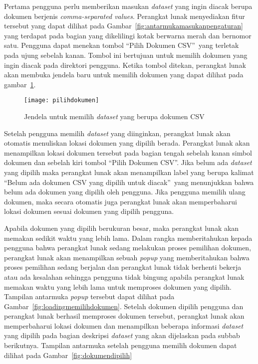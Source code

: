 Pertama pengguna perlu memberikan masukan \textit{dataset} yang ingin diacak berupa dokumen berjenis \textit{comma-separated values}. Perangkat lunak menyediakan fitur tersebut yang dapat dilihat pada Gambar~\ref{fig:antarmukamasukanpengaturan} yang terdapat pada bagian yang dikelilingi kotak berwarna merah dan bernomor satu. Pengguna dapat menekan tombol \textquotedblleft Pilih Dokumen CSV\textquotedblright~yang terletak pada ujung sebelah kanan. Tombol ini bertujuan untuk memilih dokumen yang ingin diacak pada direktori pengguna. Ketika tombol ditekan, perangkat lunak akan membuka jendela baru untuk memilih dokumen yang dapat dilihat pada gambar~\ref{fig:pilihdokumen}.

\begin{figure}
	\centering
	\texttt{[image: pilihdokumen]}
	\caption{Jendela untuk memilih \textit{dataset} yang berupa dokumen CSV}
	\label{fig:pilihdokumen}
\end{figure}

Setelah pengguna memilih \textit{dataset} yang diinginkan, perangkat lunak akan otomatis menuliskan lokasi dokumen yang dipilih berada. Perangkat lunak akan menampilkan lokasi dokumen tersebut pada bagian tengah sebelah kanan simbol dokumen dan sebelah kiri tombol \textquotedblleft Pilih Dokumen CSV\textquotedblright. Jika belum ada \textit{dataset} yang dipilih maka perangkat lunak akan menampilkan label yang berupa kalimat \textquotedblleft Belum ada dokumen CSV yang dipilih untuk diacak\textquotedblright~yang menunjukkan bahwa belum ada dokumen yang dipilih oleh pengguna. Jika pengguna memilih ulang dokumen, maka secara otomatis juga perangkat lunak akan memperbaharui lokasi dokumen sesuai dokumen yang dipilih pengguna.

Apabila dokumen yang dipilih berukuran besar, maka perangkat lunak akan memakan sedikit waktu yang lebih lama. Dalam rangka memberitahukan kepada pengguna bahwa perangkat lunak sedang melakukan proses pemilihan dokumen, perangkat lunak akan menampilkan sebuah \textit{popup} yang memberitahukan bahwa proses pemilihan sedang berjalan dan perangkat lunak tidak berhenti bekerja atau ada kesalahan sehingga pengguna tidak bingung apabila perangkat lunak memakan waktu yang lebih lama untuk memproses dokumen yang dipilih. Tampilan antarmuka \textit{popup} tersebut dapat dilihat pada Gambar~\ref{fig:loadingmemilihdokumen}. Setelah dokumen dipilih pengguna dan perangkat lunak berhasil memproses dokumen tersebut, perangkat lunak akan memperbaharui lokasi dokumen dan menampilkan beberapa informasi \textit{dataset} yang dipilih pada bagian deskripsi \textit{dataset} yang akan dijelaskan pada subbab berikutnya. Tampilan antarmuka setelah pengguna memilih dokumen dapat dilihat pada Gambar~\ref{fig:dokumendipilih}

